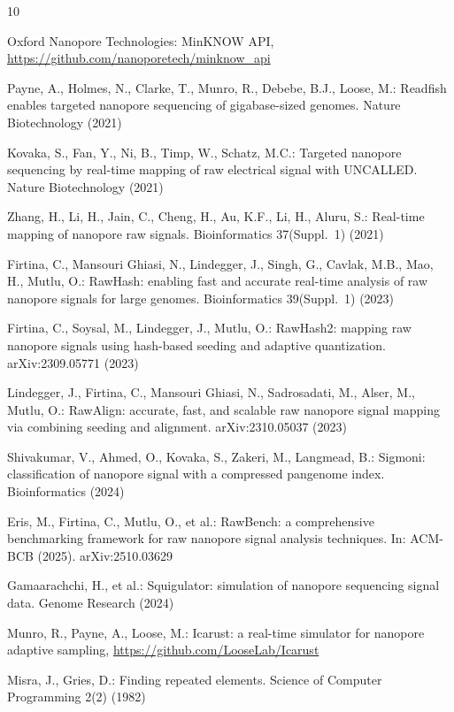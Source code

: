 \documentclass[runningheads]{llncs}
\begin{document}
\begin{thebibliography}{10}

 Oxford Nanopore Technologies: MinKNOW API,
\url{https://github.com/nanoporetech/minknow_api}

 Payne, A., Holmes, N., Clarke, T., Munro, R., Debebe, B.J., Loose, M.:
Readfish enables targeted nanopore sequencing of gigabase-sized genomes. Nature Biotechnology
(2021)

 Kovaka, S., Fan, Y., Ni, B., Timp, W., Schatz, M.C.: Targeted nanopore
sequencing by real-time mapping of raw electrical signal with UNCALLED. Nature Biotechnology
(2021)

 Zhang, H., Li, H., Jain, C., Cheng, H., Au, K.F., Li, H., Aluru, S.: Real-time
mapping of nanopore raw signals. Bioinformatics 37(Suppl.~1) (2021)

 Firtina, C., Mansouri Ghiasi, N., Lindegger, J., Singh, G., Cavlak, M.B.,
Mao, H., Mutlu, O.: RawHash: enabling fast and accurate real-time analysis of raw nanopore
signals for large genomes. Bioinformatics 39(Suppl.~1) (2023)

 Firtina, C., Soysal, M., Lindegger, J., Mutlu, O.: RawHash2: mapping raw
nanopore signals using hash-based seeding and adaptive quantization. arXiv:2309.05771 (2023)

 Lindegger, J., Firtina, C., Mansouri Ghiasi, N., Sadrosadati, M., Alser,
M., Mutlu, O.: RawAlign: accurate, fast, and scalable raw nanopore signal mapping via combining
seeding and alignment. arXiv:2310.05037 (2023)

 Shivakumar, V., Ahmed, O., Kovaka, S., Zakeri, M., Langmead, B.: Sigmoni:
classification of nanopore signal with a compressed pangenome index. Bioinformatics (2024)

 Eris, M., Firtina, C., Mutlu, O., et al.: RawBench: a comprehensive
benchmarking framework for raw nanopore signal analysis techniques. In: ACM-BCB (2025).
arXiv:2510.03629

 Gamaarachchi, H., et al.: Squigulator: simulation of nanopore sequencing
signal data. Genome Research (2024)

 Munro, R., Payne, A., Loose, M.: Icarust: a real-time simulator for nanopore
adaptive sampling, \url{https://github.com/LooseLab/Icarust}

 Misra, J., Gries, D.: Finding repeated elements. Science of Computer
Programming 2(2) (1982)


\end{thebibliography}
\end{document}
